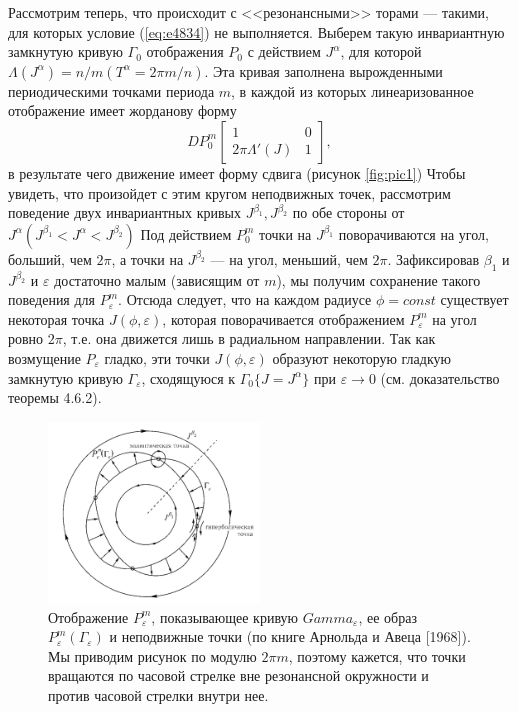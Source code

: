 \documentclass[twoside, a4paper]{article}
\begin{document}
Рассмотрим теперь, что происходит с <<резонансными>> торами --- такими, для которых условие (\ref{eq:e4834}) не выполняется. Выберем такую инвариантную замкнутую кривую $\Gamma_0$ отображения $P_0$ с действием $J^\alpha$, для которой $\Lambda(J^\alpha) = n/m (T^\alpha = 2\pi m/n)$. Эта кривая заполнена вырожденными периодическими точками периода $m$, в каждой из которых линеаризованное отображение имеет жорданову форму
\begin{equation}
DP^m_0
\left[\begin{array}{cc}
1 & 0\\
2\pi\Lambda'(J) & 1
\end{array}\right],
\label{eq:e4835}
\end{equation}
в результате чего движение имеет форму сдвига (рисунок \ref{fig:pic1})
Чтобы увидеть, что произойдет с этим кругом неподвижных точек, рассмотрим
поведение двух инвариантных кривых $ J^{\beta_1}, J^{\beta_2}$ по обе стороны от $J^\alpha (J^{\beta_1}<J^\alpha<J^{\beta_2})$ Под действием $P^m_0$ точки на $J^{\beta_1}$ поворачиваются на угол, больший, чем $2\pi$, а точки на $J^{\beta_2}$ — на угол, меньший, чем $2\pi$. Зафиксировав $\beta_1$ и $J^{\beta_2}$ и $\varepsilon$ достаточно малым (зависящим от $m$), мы получим сохранение такого поведения для $P^m_\varepsilon$. Отсюда следует, что на каждом радиусе $\phi = const$ существует некоторая точка $J(\phi, \varepsilon)$, которая поворачивается отображением $P_\varepsilon^m$ на угол ровно $2\pi$, т.е. она движется лишь в радиальном направлении. Так как возмущение $P_\varepsilon$ гладко, эти точки $J(\phi, \varepsilon)$ образуют некоторую гладкую замкнутую кривую $\Gamma_\varepsilon$, сходящуюся к $\Gamma_0\{J=J^\alpha\}$ при $\varepsilon \to 0$ (см. доказательство теоремы 4.6.2).
\begin{figure}
\centering
\includegraphics[width=0.5\textwidth]{pme}
\caption{Отображение $P^m_\varepsilon$, показывающее кривую $Gamma_\varepsilon$, ее образ $P^m_\varepsilon(\Gamma_\varepsilon)$ и неподвижные точки (по книге Арнольда и Авеца [1968]). Мы приводим рисунок по модулю $2\pi m$, поэтому кажется, что точки вращаются по часовой стрелке вне резонансной окружности и против часовой стрелки внутри нее.}
\label{fig:pic2}
\end{figure}
\end{document}
